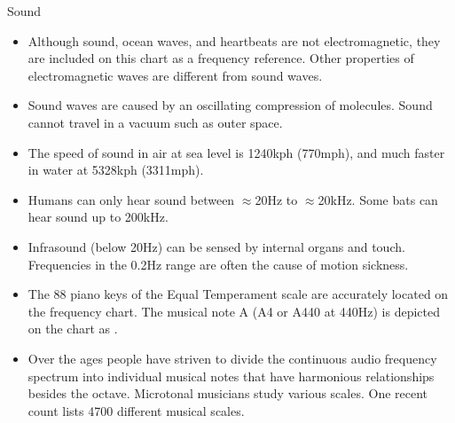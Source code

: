 {\Large Sound}
{
%
\begin{itemize}

\item Although sound, ocean waves, and heartbeats are not electromagnetic, they are included on this chart as a frequency reference. Other properties of electromagnetic waves are different from sound waves.

\item Sound waves are caused by an oscillating compression of molecules. Sound cannot travel in a vacuum such as outer space.

\item The speed of sound in air at sea level is 1240kph (770mph), and much faster in water at 5328kph (3311mph).

\item Humans can only hear sound between $\approx$20Hz to $\approx$20kHz. Some bats can hear sound up to 200kHz.

\item Infrasound (below 20Hz) can be sensed by internal organs and touch.
%
Frequencies in the 0.2Hz range are often the cause of motion sickness.


\item The 88 piano keys of the Equal Temperament scale are accurately located on the frequency chart. The musical note A (A4 or A440 at 440Hz) is depicted on the chart as \pscirclebox[fillstyle=solid,fillcolor=HumanAudioColor]{\textcolor{white}{A4}}.

\item Over the ages people have striven to divide the continuous audio frequency spectrum into individual musical notes that have harmonious relationships besides the octave. Microtonal musicians study various scales. One recent count lists 4700 different musical scales.



\end{itemize}}
